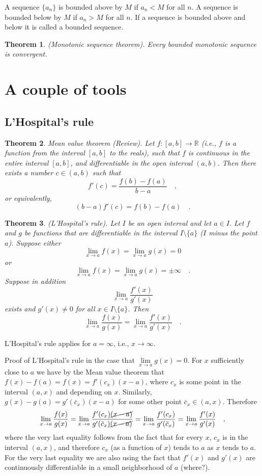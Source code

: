 \documentclass[12pt]{book}
\newtheorem{theorem}{Theorem}[section]
\begin{document}
A sequence $\{a_n\}$ is bounded above by $M$ if $a_n<M$ for all $n$. A sequence is bounded below by $M$ if $a_n>M$ for all $n$. If a sequence is bounded above and below it is called a bounded sequence. 

\begin{theorem}\label{thMonotonicSequenceThereom}
 (Monotonic sequence theorem). Every bounded monotonic sequence is convergent.
\end{theorem}
\section{A couple of tools}
\subsection{L'Hospital's rule}
\begin{theorem}
 Mean value theorem (Review). Let $f:[a,b]\to \mathbb R$ (i.e., $f$ is a function from the interval $[a,b]$ to the reals), such that $f$ is continuous in the entire interval $[a,b]$, and differentiable in the open interval $(a,b)$. Then there exists a number $c\in (a,b)$ such that
\[
f'(c)=\frac{f(b)-f(a)}{b-a}\quad,
\]
or equivalently,
\[
(b-a)f'(c)=f(b)-f(a)\quad .
\]
\end{theorem}

\begin{theorem} 
(L'Hospital's rule). Let $I$ be an open interval and let $a\in I$. Let $f$ and $g$ be functions that are differentiable in the interval $I\setminus \{a\}$ ($I$ minus the point $a$). Suppose either
\[
\lim_{x\to a} f(x)= \lim_{x\to a}g(x)=0
\]
or
\[
\lim_{x\to a} f(x)= \lim_{x\to a}g(x)=\pm \infty\quad .
\]
Suppose in addition
\[
\lim_{x\to a} \frac{f'(x)}{g'(x)}
\]
exists and $g'(x)\neq 0$ for all $x\in I\setminus \{a\}$. Then
\[
\lim_{x\to a}\frac{f(x)}{g(x)}= \lim_{x\to a} \frac{f'(x)}{g'(x)}\quad .
\]
\end{theorem}

L'Hospital's rule applies for $a=\infty$, i.e., $x\to \infty$.

Proof of L'Hospital's rule in the case that $\lim\limits_{x\to a}g(x)=0 $. For $x$ sufficiently close to $a$ we have by the Mean value theorem that $f(x)-f(a)=f(x)=  f'(c_x) (x-a) $, where $c_x$ is some point in the interval $(a,x)$ and depending on $x$. Similarly, $g(x)- g(a)= g'(\bar c_x)(x-a)$ for some other point $\bar c_x\in (a,x)$. Therefore
\[
\lim\limits_{x\to a}\frac{f(x)}{g(x)}=\lim\limits_{x\to a}\frac{f'(c_x) \cancel{(x-a)}}{ g'(\bar c_x)\cancel{(x-a)}} = \lim\limits_{x\to a}\frac{f'(c_x) }{ g'(\bar c_x)}=\lim\limits_{x\to a}\frac{f'(x) }{ g'(x)}\quad ,
\]
where the very last equality follows from the fact that for every $x$, $c_x$ is in the interval $(a,x)$, and therefore $c_x$ (as a function of $x$) tends to $a$ as $x$ tends to $a$. For the very last equality we are also using the fact that $f'(x)$ and $g'(x)$ are continuously differentiable in a small neighborhood of $a$ (where?).
\end{document}
